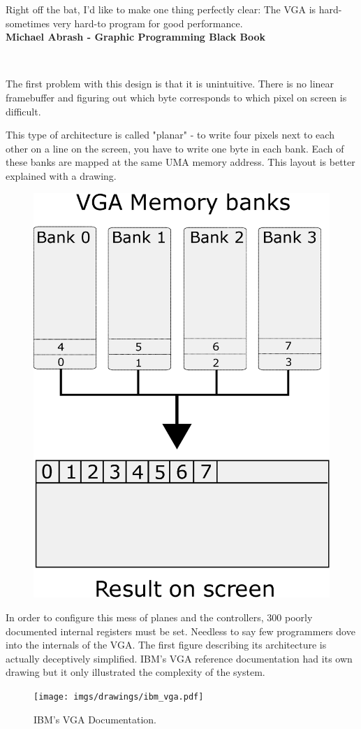 \documentclass[book.tex]{subfiles}
\begin{document}
 \begin{fancyquotes}
   Right off the bat, I'd like to make one thing perfectly clear: The VGA is hard-sometimes very hard-to program for good performance.
 \bigskip \\
\textbf{Michael Abrash - Graphic Programming Black Book}
 \end{fancyquotes}
 \\
\par
The first problem with this design is that it is unintuitive. There is no linear framebuffer and figuring out which byte corresponds to which pixel on screen is difficult.\\
\par
 This type of architecture is called "planar" - to write four pixels next to each other on a line on the screen, you have to write one byte in each bank. Each of these banks are mapped at the same UMA memory address. This layout is better explained with a drawing.\\
\par
\begin{figure}[H]
\centering
\includegraphics[width=.6\textwidth]{imgs/drawings/vga_ram_screen_layout.eps}
\label{fig:vga_arch}
\end{figure}

 

\par
In order to configure this mess of planes and the controllers, 300 poorly documented internal registers must be set. Needless to say few programmers dove into the internals of the VGA. The first figure describing its architecture is actually deceptively simplified. IBM's VGA reference documentation had its own drawing but it only illustrated the complexity of the system.\\
 \begin{figure}[H]
\centering
\texttt{[image: imgs/drawings/ibm\_vga.pdf]}
\caption{IBM's VGA Documentation.}
\label{fig:ibm_vga}
\end{figure}
\end{document}
